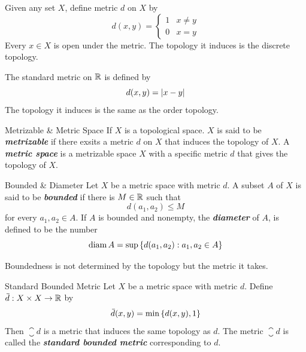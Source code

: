 \documentclass[12pt,a4paper]{article}
\begin{document}
    \begin{eg}
        Given any set $X$, define metric $d$ on $X$ by 
        $$
        d(x,y)=\begin{cases}
            1 & x\neq y\\
            0 & x=y
        \end{cases}
        $$
        Every $x\in X$ is open under the metric. The topology it induces is the discrete topology.
    \end{eg}

    \begin{eg}
        The standard metric on $\mathbb{R}$ is defined by 
        $$
        d(x,y)=\left\lvert x-y\right\rvert
        $$
        The topology it induces is the same as the order topology.
    \end{eg}
    \hfill

    \begin{defi}{Metrizable \& Metric Space}
        If $X$ is a topological space. $X$ is said to be \textbf{\textit{metrizable}} if there exsits a metric $d$ on $X$ that induces the topology of $X$. A \textbf{\textit{metric space}} is a metrizable space $X$ with a specific metric $d$ that gives the topology of $X$.
    \end{defi}
    \hfill

    \begin{defi}{Bounded \& Diameter}
        Let $X$ be a metric space with metric $d$. A subset $A$ of $X$ is said to be \textbf{\textit{bounded}} if there is $M\in\mathbb{R}$ such that
        $$
        d(a_1,a_2)\leq M
        $$
        for every $a_1,a_2\in A$. If $A$ is bounded and nonempty, the \textbf{\textit{diameter}} of $A$, is defined to be the number
        $$
        \operatorname{diam} A=\sup\left\{d(a_1,a_2):a_1,a_2\in A\right\}
        $$
    \end{defi}
    \begin{remark}
        Boundedness is not determined by the topology but the metric it takes.
    \end{remark}
    \hfill

    \begin{defi}{Standard Bounded Metric}
        Let $X$ be a metric space with metric $d$. Define ${}\mkern3mu\overline{\mkern-3mud}:X\times X\to\mathbb{R}$ by
        $$
        {}\mkern3mu\overline{\mkern-3mud}(x,y)=\min\left\{d(x,y),1\right\}
        $$
        Then $\closure{d}$ is a metric that induces the same topology as $d$. The metric $\closure{d}$ is called the \textbf{\textit{standard bounded metric}} corresponding to $d$.
    \end{defi}
    \hfill
\end{document}

